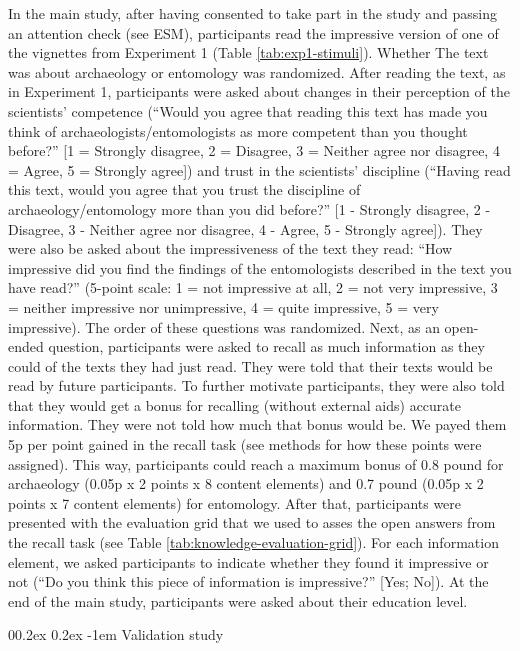 \documentclass[
  doc,floatsintext]{apa6}
\makeatletter
\let\oldparagraph\paragraph
\renewcommand{\paragraph}{
    \@ifstar
      \xxxParagraphStar
      \xxxParagraphNoStar
  }
\newcommand{\xxxParagraphStar}[1]{\oldparagraph*{#1}\mbox{}}
\newcommand{\xxxParagraphNoStar}[1]{\oldparagraph{#1}\mbox{}}
\renewcommand{\paragraph}{\@startsection{paragraph}{4}{\parindent}%
  {0\baselineskip \@plus 0.2ex \@minus 0.2ex}%
  {-1em}%
  {\normalfont\normalsize\bfseries\itshape\typesectitle}}
\makeatother
\begin{document}
In the main study, after having consented to take part in the study and passing an attention check (see ESM), participants read the impressive version of one of the vignettes from Experiment 1 (Table \ref{tab:exp1-stimuli}). Whether The text was about archaeology or entomology was randomized. After reading the text, as in Experiment 1, participants were asked about changes in their perception of the scientists' competence (``Would you agree that reading this text has made you think of archaeologists/entomologists as more competent than you thought before?'' {[}1 = Strongly disagree, 2 = Disagree, 3 = Neither agree nor disagree, 4 = Agree, 5 = Strongly agree{]}) and trust in the scientists' discipline (``Having read this text, would you agree that you trust the discipline of archaeology/entomology more than you did before?'' {[}1 - Strongly disagree, 2 - Disagree, 3 - Neither agree nor disagree, 4 - Agree, 5 - Strongly agree{]}). They were also be asked about the impressiveness of the text they read: ``How impressive did you find the findings of the entomologists described in the text you have read?'' (5-point scale: 1 = not impressive at all, 2 = not very impressive, 3 = neither impressive nor unimpressive, 4 = quite impressive, 5 = very impressive). The order of these questions was randomized. Next, as an open-ended question, participants were asked to recall as much information as they could of the texts they had just read. They were told that their texts would be read by future participants. To further motivate participants, they were also told that they would get a bonus for recalling (without external aids) accurate information. They were not told how much that bonus would be. We payed them 5p per point gained in the recall task (see methods for how these points were assigned). This way, participants could reach a maximum bonus of 0.8 pound for archaeology (0.05p x 2 points x 8 content elements) and 0.7 pound (0.05p x 2 points x 7 content elements) for entomology. After that, participants were presented with the evaluation grid that we used to asses the open answers from the recall task (see Table \ref{tab:knowledge-evaluation-grid}). For each information element, we asked participants to indicate whether they found it impressive or not (``Do you think this piece of information is impressive?'' {[}Yes; No{]}). At the end of the main study, participants were asked about their education level.

\paragraph{Validation study}\label{validation-study}
\end{document}
